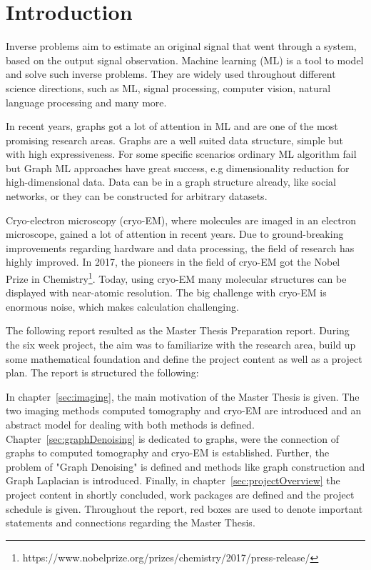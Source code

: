\chapter{Introduction}
\label{sec:introduction}

Inverse problems aim to estimate an original signal that went through a system, based on the output signal observation.
Machine learning (ML) is a tool to model and solve such inverse problems.
They are widely used throughout different science directions, such as ML,
signal processing, computer vision, natural language processing and many more.

In recent years, graphs got a lot of attention in ML and are one of the most promising research areas.
Graphs are a well suited data structure, simple but with high expressiveness. 
For some specific scenarios ordinary ML algorithm fail but Graph ML approaches have great success, e.g dimensionality reduction for high-dimensional data.
Data can be in a graph structure already, like social networks, or they can be constructed for arbitrary datasets.


Cryo-electron microscopy (cryo-EM), where molecules are imaged in an electron microscope,
gained a lot of attention in recent years. 
Due to ground-breaking improvements regarding hardware and data processing, the field of research
has highly improved. In 2017, the pioneers in the field of cryo-EM got the 
Nobel Prize in Chemistry\footnote{https://www.nobelprize.org/prizes/chemistry/2017/press-release/}.
Today, using cryo-EM many molecular structures can be displayed with near-atomic resolution.
The big challenge with cryo-EM is enormous noise, which makes calculation challenging. 

\bigskip

The following report resulted as the Master Thesis Preparation report. During the six week project, 
the aim was to familiarize with the research area, build up some mathematical foundation 
and define the project content as well as a project plan.
The report is structured the following:

In chapter~\ref{sec:imaging}, the main motivation of the Master Thesis is given. The two imaging methods
computed tomography and cryo-EM are introduced and an abstract model for dealing with both methods is defined.
Chapter~\ref{sec:graphDenoising} is dedicated to graphs, were the connection of graphs to computed tomography and 
cryo-EM is established. Further, the problem of "Graph Denoising" is defined and methods like graph construction and Graph Laplacian
is introduced.
Finally, in chapter~\ref{sec:projectOverview} the project content in shortly concluded, work packages are defined and the project schedule is given.
Throughout the report, red boxes are used to denote important statements and connections regarding the Master Thesis.
